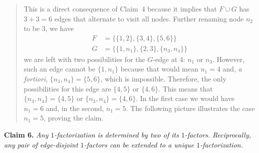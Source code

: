 \begin{solution}
\begin{description}
        \begin{quote}
            This is a direct consequence of Claim~4 because it implies that $F\cup G$ has $3+3=6$ edges that alternate to visit all nodes. Further renaming node $n_2$ to be $3$, we have
             \begin{align*}
                F &= \{\{1,2\},\{3,4\},\{5,6\}\}\\
                G &= \{\{1,n_1\},\{2,3\},\{n_3,n_4\}\}
            \end{align*}
            we are left with two possibilities for the $G$-edge at $4$: $n_1$ or $n_3$. However, such an edge cannot be $\{1,n_1\}$ because that would mean $n_1=4$ and, \textit{a fortiori}, $\{n_3,n_4\}=\{5,6\}$, which is impossible. Therefore, the only possibilities for this edge are $\{4,5\}$ or $\{4,6\}$. This means that $\{n_3,n_4\}=\{4,5\}$ or $\{n_3,n_4\}=\{4,6\}$. In the first case we would have $n_1=6$ and, in the second, $n_1=5$. The following picture illustrates the case $n_1=5$, proving the claim.
            \begin{center}
            \end{center}
        \end{quote}

        \textbf{Claim 6.} \textit{Any\/ $1$-factorization is determined by two of its\/ $1$-factors. Reciprocally, any pair of edge-disjoint\/ $1$-factors can be extended to a unique\/ $1$-factorization.}


\end{description}
\end{solution}
